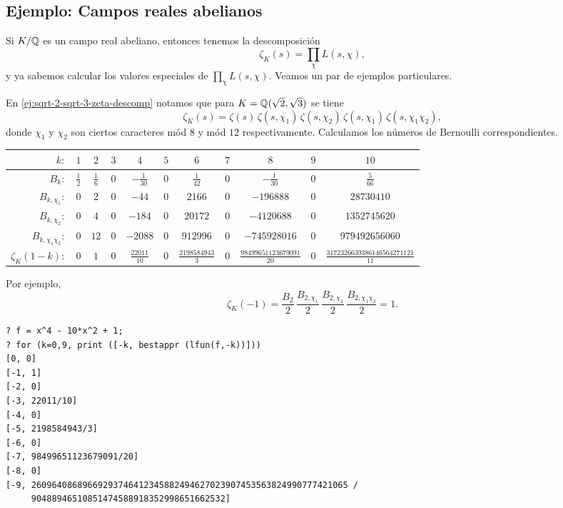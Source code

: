 \subsection{Ejemplo: Campos reales abelianos}

Si $K/\mathbb{Q}$ es un campo real abeliano, entonces tenemos la descomposición
$$\zeta_K (s) = \prod_\chi L (s,\chi),$$
y ya sabemos calcular los valores especiales de $\prod_\chi L (s,\chi)$.
Veamos un par de ejemplos particulares.

\begin{ejemplo}
  En \ref{ej:sqrt-2-sqrt-3-zeta-descomp} notamos que para
  $K = \mathbb{Q} (\sqrt{2},\sqrt{3})$ se tiene
  $$\zeta_K (s) = \zeta (s)\,\zeta (s,\chi_1)\,\zeta (s,\chi_2)\,\zeta (s,\chi_1)\,\zeta (s,\chi_1\chi_2),$$
  donde $\chi_1$ y $\chi_2$ son ciertos caracteres mód $8$ y mód $12$
  respectivamente. Calculamos los números de Bernoulli correspondientes.

  \begin{center}
    \renewcommand{\arraystretch}{1.5}
    \begin{tabular}{rcccccccccc}
      \hline
      $k\colon$ & $1$ & $2$ & $3$ & $4$ & $5$ & $6$ & $7$ & $8$ & $9$ & $10$ \\
      \hline
      $B_k\colon$ & $\frac{1}{2}$ & $\frac{1}{6}$ & $0$ & $-\frac{1}{30}$ & $0$ & $\frac{1}{42}$ & $0$ & $-\frac{1}{30}$ & $0$ & $\frac{5}{66}$ \\
      \hline
      $B_{k,\chi_1}\colon$ & $0$ & $2$ & $0$ & $-44$ & $0$ & $2166$ & $0$ & $-196888$ & $0$ & $28730410$ \\
      \hline
      $B_{k,\chi_2}\colon$ & $0$ & $4$ & $0$ & $-184$ & $0$ & $20172$ & $0$ & $-4120688$ & $0$ & $1352745620$ \\
      \hline
      $B_{k,\chi_1 \chi_2}\colon$ & $0$ & $12$ & $0$ & $-2088$ & $0$ & $912996$ & $0$ & $-745928016$ & $0$ & $979492656060$ \\
      \hline
      $\zeta_K (1-k)\colon$ & $0$ & $1$ & $0$ & $\frac{22011}{10}$ & $0$ & $\frac{2198584943}{3}$ & $0$ & $\frac{98499651123679091}{20}$ & $0$ & $\frac{3172326639386146564271121}{11}$ \\
      \hline
    \end{tabular}
  \end{center}

  Por ejemplo,
  $$\zeta_K (-1) = \frac{B_2}{2}\,\frac{B_{2,\chi_1}}{2}\,\frac{B_{2,\chi_2}}{2}\,\frac{B_{2,\chi_1\chi_2}}{2} = 1.$$

  \begin{shaded}
\begin{verbatim}
? f = x^4 - 10*x^2 + 1;
? for (k=0,9, print ([-k, bestappr (lfun(f,-k))]))
[0, 0]
[-1, 1]
[-2, 0]
[-3, 22011/10]
[-4, 0]
[-5, 2198584943/3]
[-6, 0]
[-7, 98499651123679091/20]
[-8, 0]
[-9, 26096408689669293746412345882494627023907453563824990777421065 /
     90488946510851474588918352998651662532]


\end{verbatim}
\end{shaded}
\end{ejemplo}
